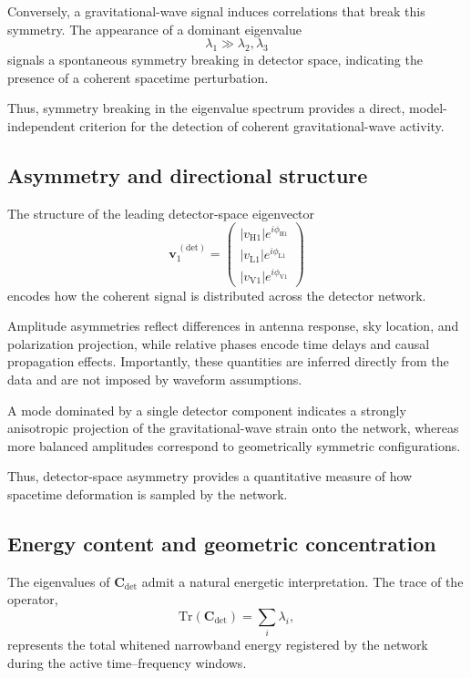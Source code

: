 \documentclass[11pt,a4paper]{article}
\begin{document}
Conversely, a gravitational-wave signal induces correlations that break this symmetry.
The appearance of a dominant eigenvalue
\[
\lambda_1 \gg \lambda_2, \lambda_3
\]
signals a spontaneous symmetry breaking in detector space,
indicating the presence of a coherent spacetime perturbation.

Thus, symmetry breaking in the eigenvalue spectrum provides a direct, model-independent
criterion for the detection of coherent gravitational-wave activity.

\subsection{Asymmetry and directional structure}

The structure of the leading detector-space eigenvector
\[
\mathbf{v}^{\,(\mathrm{det})}_1 =
\begin{pmatrix}
|v_{\mathrm{H1}}| e^{i\phi_{\mathrm{H1}}} \\
|v_{\mathrm{L1}}| e^{i\phi_{\mathrm{L1}}} \\
|v_{\mathrm{V1}}| e^{i\phi_{\mathrm{V1}}}
\end{pmatrix}
\]
encodes how the coherent signal is distributed across the detector network.

Amplitude asymmetries reflect differences in antenna response, sky location,
and polarization projection, while relative phases encode time delays
and causal propagation effects.
Importantly, these quantities are inferred directly from the data
and are not imposed by waveform assumptions.

A mode dominated by a single detector component indicates a strongly anisotropic
projection of the gravitational-wave strain onto the network,
whereas more balanced amplitudes correspond to geometrically symmetric configurations.

Thus, detector-space asymmetry provides a quantitative measure of how spacetime deformation
is sampled by the network.

\subsection{Energy content and geometric concentration}

The eigenvalues of $\mathbf{C}_{\mathrm{det}}$ admit a natural energetic interpretation.
The trace of the operator,
\[
\mathrm{Tr}(\mathbf{C}_{\mathrm{det}}) = \sum_i \lambda_i,
\]
represents the total whitened narrowband energy registered by the network
during the active time--frequency windows.
\end{document}
